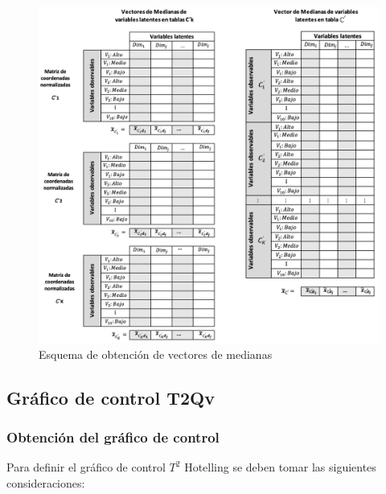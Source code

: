\documentclass[mathematics,article,submit,moreauthors,pdftex]{mdpi}
\begin{document}
\begin{figure}[!h]


\begin{center}\includegraphics[width=0.9\linewidth,]{esquema_2} \end{center}

\caption{Esquema de obtención de vectores de medianas}

\label{fig:esquema2}
\end{figure}

\hypertarget{gruxe1fico-de-control-t2qv}{%
\subsection{Gráfico de control T2Qv}\label{gruxe1fico-de-control-t2qv}}

\hypertarget{obtenciuxf3n-del-gruxe1fico-de-control}{%
\subsubsection{Obtención del gráfico de
control}\label{obtenciuxf3n-del-gruxe1fico-de-control}}

Para definir el gráfico de control \(T^2\) Hotelling se deben tomar las
siguientes consideraciones:
\end{document}
